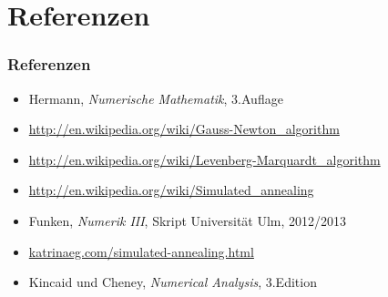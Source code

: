 \documentclass[aspectratio=169]{beamer}
\begin{document}

	\section{Referenzen} %
	\label{sec:referenzen}
		
		\begin{frame}
			\frametitle{Referenzen}

			\begin{itemize}[label=$\circ$]
				\item Hermann, \textit{Numerische Mathematik}, 3.Auflage
				\item \url{http://en.wikipedia.org/wiki/Gauss-Newton_algorithm}
				\item \url{http://en.wikipedia.org/wiki/Levenberg-Marquardt_algorithm}
				\item \url{http://en.wikipedia.org/wiki/Simulated_annealing}
				\item Funken, \textit{Numerik III}, Skript Universität Ulm, 2012/2013
				\item \url{katrinaeg.com/simulated-annealing.html}
				\item Kincaid und Cheney, \textit{Numerical Analysis}, 3.Edition
			\end{itemize}
		\end{frame}

\end{document}
